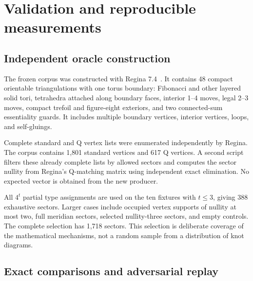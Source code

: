 \documentclass[11pt]{article}
\theoremstyle{definition}
\theoremstyle{remark}
\begin{document}
\section{Validation and reproducible measurements}
\label{sec:experiments}

\subsection{Independent oracle construction}

The frozen corpus was constructed with Regina 7.4~\cite{regina}. It contains
48 compact orientable triangulations with one torus boundary: Fibonacci and
other layered solid tori, tetrahedra attached along boundary faces, interior
1--4 moves, legal 2--3 moves, compact trefoil and figure-eight exteriors,
and two connected-sum essentiality guards. It includes multiple boundary
vertices, interior vertices, loops, and self-gluings.

Complete standard and Q vertex lists were enumerated independently by Regina.
The corpus contains 1,801 standard vertices and 617 Q vertices. A second script
filters these already complete lists by allowed sectors and computes the
sector nullity from Regina's Q-matching matrix using independent exact
elimination. No expected vector is obtained from the new producer.

All $4^t$ partial type assignments are used on the ten fixtures with $t\le3$,
giving 388 exhaustive sectors. Larger cases include occupied vertex supports
of nullity at most two, full meridian sectors, selected nullity-three sectors,
and empty controls. The complete selection has 1,718 sectors. This selection
is deliberate coverage of the mathematical mechanisms, not a random sample
from a distribution of knot diagrams.

\subsection{Exact comparisons and adversarial replay}
\end{document}
